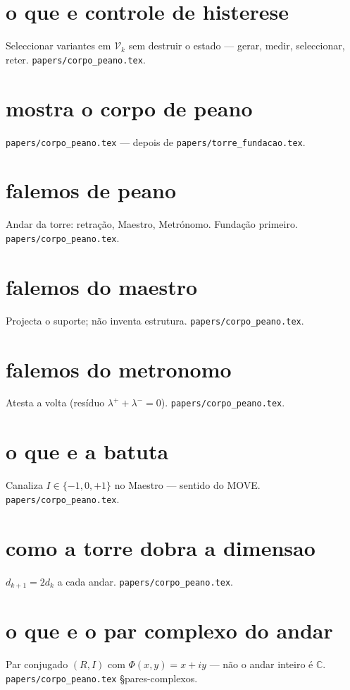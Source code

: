 \documentclass[11pt,a4paper]{article}
\newcommand{\code}[1]{\texttt{\small #1}}
\begin{document}
\section{o que e controle de histerese}
Seleccionar variantes em $\mathcal{V}_k$ sem destruir o estado --- gerar, medir, seleccionar, reter.
\code{papers/corpo\_peano.tex}.

\section{mostra o corpo de peano}
\code{papers/corpo\_peano.tex} --- depois de \code{papers/torre\_fundacao.tex}.

\section{falemos de peano}
Andar da torre: retração, Maestro, Metrónomo. Fundação primeiro.
\code{papers/corpo\_peano.tex}.

\section{falemos do maestro}
Projecta o suporte; não inventa estrutura.
\code{papers/corpo\_peano.tex}.

\section{falemos do metronomo}
Atesta a volta (resíduo $\lambda^{+}+\lambda^{-}=0$).
\code{papers/corpo\_peano.tex}.

\section{o que e a batuta}
Canaliza $I\in\{-1,0,+1\}$ no Maestro --- sentido do MOVE.
\code{papers/corpo\_peano.tex}.

\section{como a torre dobra a dimensao}
$d_{k+1}=2d_k$ a cada andar.
\code{papers/corpo\_peano.tex}.

\section{o que e o par complexo do andar}
Par conjugado $(R,I)$ com $\Phi(x,y)=x+iy$ --- não o andar inteiro é $\mathbb{C}$.
\code{papers/corpo\_peano.tex} \S pares-complexos.
\end{document}
